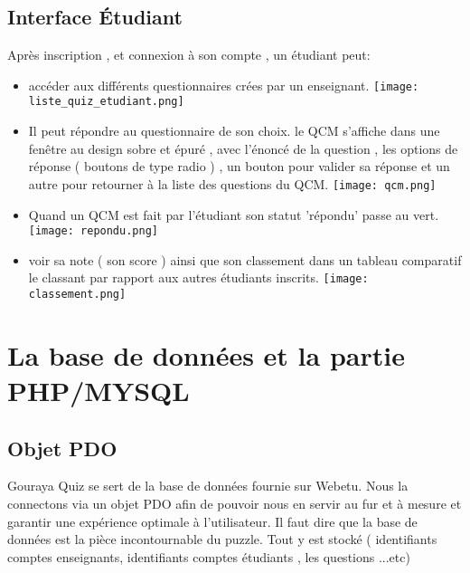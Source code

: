 \documentclass[12pt,a4paper]{article}
\begin{document}
\subsection{Interface Étudiant}
Après inscription , et connexion à son compte , un étudiant peut:
\begin{center}
\begin{itemize}

\item accéder aux différents questionnaires crées par un enseignant.
\newline
\texttt{[image: liste\_quiz\_etudiant.png]}
\newline
\item  Il peut répondre au questionnaire de son choix.
le QCM s'affiche dans une fenêtre au design sobre et épuré , avec l'énoncé de la question , les options de réponse ( boutons de type radio ) , un bouton pour valider sa réponse et un autre pour retourner à la liste des questions du QCM.
\newline
\newline
\texttt{[image: qcm.png]}
\newline
\newline
\item Quand un QCM est fait par l'étudiant son statut 'répondu' passe au vert.
\newline
\newline
\texttt{[image: repondu.png]}
\newline
\newline

\item voir sa note ( son score ) ainsi que son classement dans un tableau comparatif le classant par rapport aux autres étudiants inscrits.
\newline
\newline
\texttt{[image: classement.png]}
\newline
\end{itemize}
\end{center}
	

\section{La base de données et la partie PHP/MYSQL}
\subsection{Objet PDO}
Gouraya Quiz se sert de la base de données fournie sur Webetu.
Nous la connectons via un objet PDO afin de pouvoir nous en servir au fur et à mesure et garantir une expérience optimale à l'utilisateur. 
Il faut dire que la base de données est la pièce incontournable du puzzle. Tout y est stocké ( identifiants comptes enseignants,
identifiants comptes étudiants , les questions ...etc)
\end{document}
